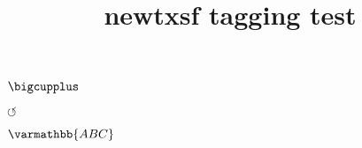 \documentclass{article}
\title{newtxsf tagging test}
\begin{document}
\checkmark

\circledR

\maltese

\textsquare

$\bigcupplus$

$\circlearrowleft$

$\varmathbb{ABC}$
\end{document}
